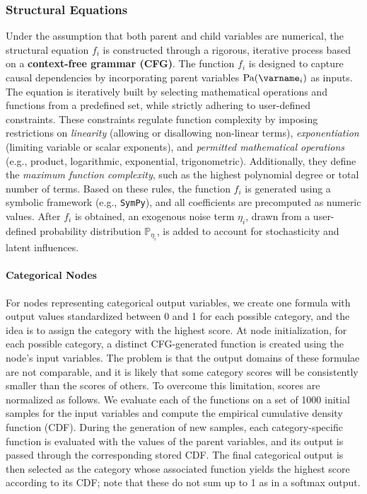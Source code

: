 \documentclass{article}
\begin{document}
        \subsubsection{Structural Equations}
            Under the assumption that both parent and child variables are numerical, the structural equation $f_i$ is constructed through a rigorous, iterative process based on a \textbf{context-free grammar (CFG)}. 
            The function $f_i$ is designed to capture causal dependencies by incorporating parent variables $\text{Pa}(\varname_i)$ as inputs. 
            The equation is iteratively built by selecting mathematical operations and functions from a predefined set, while strictly adhering to user-defined constraints. 
            These constraints regulate function complexity by imposing restrictions on \emph{linearity} (allowing or disallowing non-linear terms), \emph{exponentiation} (limiting variable or scalar exponents), and \emph{permitted mathematical operations} (e.g., product, logarithmic, exponential, trigonometric). Additionally, they define the \emph{maximum function complexity}, such as the highest polynomial degree or total number of terms.
            Based on these rules, the function $f_i$ is generated using a symbolic framework (e.g., \texttt{SymPy}), and all coefficients are precomputed as numeric values. 
            After $f_i$ is obtained, an exogenous noise term $\eta_i$, drawn from a user-defined probability distribution $\mathbb{P}_{\eta_i}$, is added to account for stochasticity and latent influences. 

            \paragraph{Categorical Nodes}
                For nodes representing categorical output variables, we create one formula with output values standardized between 0 and 1 for each possible category, and the idea is to assign the category with the highest score.
                At node initialization, for each possible category, a distinct CFG-generated function is created using the node’s input variables.
                The problem is that the output domains of these formulae are not comparable, and it is likely that some category scores will be consistently smaller than the scores of others.
                To overcome this limitation, scores are normalized as follows.
                We evaluate each of the functions on a set of 1000 initial samples for the input variables and compute the empirical cumulative density function (CDF).
                During the generation of new samples, each category-specific function is evaluated with the values of the parent variables, and its output is passed through the corresponding stored CDF.
                The final categorical output is then selected as the category whose associated function yields the highest score according to its CDF; note that these do not sum up to 1 as in a softmax output.
        
\end{document}
